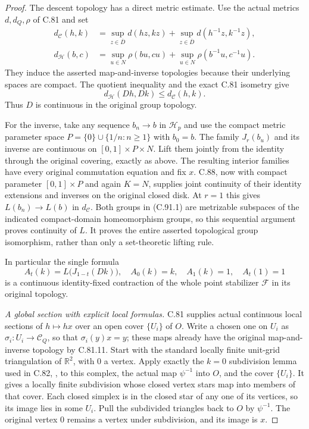 \begin{proof}
The descent topology has a direct metric estimate.
Use the actual metrics $d,d_Q,\rho$ of C.81 and set
\[
 \begin{aligned}
 d_{\mathscr C}(h,k)
   &=\sup_{z\in\overline D}d(hz,kz)
      +\sup_{z\in\overline D}d(h^{-1}z,k^{-1}z),\\
 d_{\mathscr H}(b,c)
   &=\sup_{u\in N}\rho(bu,cu)
      +\sup_{u\in N}\rho(b^{-1}u,c^{-1}u).
 \end{aligned}
\]
They induce the asserted map-and-inverse topologies
because their underlying spaces are compact.
The quotient inequality and the exact C.81 isometry give
\[
                 d_{\mathscr H}(Dh,Dk)
                       \leq d_{\mathscr C}(h,k).              \tag{C.91.10}
\]
Thus $D$ is continuous in the original group topology.

For the inverse, take any sequence $b_n\to b$ in
$\mathscr H_p$ and use the compact metric parameter space
$P=\{0\}\cup\{1/n:n\geq1\}$ with $b_0=b$.
The family $J_r(b_u)$ and its inverse are continuous
on $[0,1]\times P\times N$.
Lift them jointly from the identity through the original
covering, exactly as above.  The resulting interior
families have every original commutation equation and
fix $x$.  C.88, now with compact parameter
$[0,1]\times P$ and again $K=N$, supplies joint
continuity of their identity extensions and inverses
on the original closed disk.  At $r=1$ this gives
$L(b_n)\to L(b)$ in $d_{\mathscr C}$.
Both groups in (C.91.1) are metrizable subspaces of
the indicated compact-domain homeomorphism groups,
so this sequential argument proves continuity of $L$.
It proves the entire asserted topological group
isomorphism, rather than only a set-theoretic lifting rule.

In particular the single formula
\[
 A_t(k)=L\bigl(J_{1-t}(Dk)\bigr),
 \quad A_0(k)=k,\quad A_1(k)=1,\quad A_t(1)=1                \tag{C.91.11}
\]
is a continuous identity-fixed contraction of the whole
point stabilizer $\mathscr F$ in its original topology.

\emph{A global section with explicit local formulas.}
C.81 supplies actual continuous local sections of
$h\mapsto hx$ over an open cover $\{U_i\}$ of $O$.
Write a chosen one on $U_i$ as
$\sigma_i:U_i\to\mathscr C_Q$, so that
$\sigma_i(y)x=y$; these maps already have the original
map-and-inverse topology by C.81.11.
Start with the standard locally finite unit-grid
triangulation of $\mathbb R^2$, with $0$ a vertex.
Apply exactly the $k=0$ subdivision lemma used in C.82,
\cite[Lemma~1, p.~458]{C_Haver1975}, to this complex,
the actual map $\psi^{-1}$ into $O$, and the cover
$\{U_i\}$.  It gives a locally finite subdivision
whose closed vertex stars map into members of that
cover.  Each closed simplex is in the closed star
of any one of its vertices, so its image lies in
some $U_i$.  Pull the subdivided triangles back to
$O$ by $\psi^{-1}$.  The original vertex $0$ remains
a vertex under subdivision, and its image is $x$.


\end{proof}
